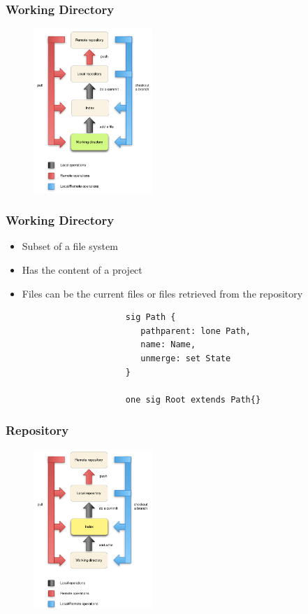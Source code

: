 \documentclass{beamer}
\begin{document}
\begin{frame}
   \frametitle{Working Directory}
   \begin{figure}
      \centering
      \includegraphics[width=0.4\textwidth]{images/workflow3.png}
   \end{figure}
\end{frame}

\begin{frame}[fragile]
   \frametitle{Working Directory}
   \begin{itemize}
      \item Subset of a file system
      \item Has the content of a project
      \item Files can be the current files or files retrieved
      from the repository
   \end{itemize}
   \tiny
   \color{blue}
   \begin{lstlisting}
                        sig Path {
                           pathparent: lone Path,
                           name: Name,
                           unmerge: set State
                        }

                        one sig Root extends Path{}
   \end{lstlisting}
\end{frame}

\begin{frame}
   \frametitle{Repository}
   \begin{figure}
      \centering
      \includegraphics[width=0.4\textwidth]{images/workflow1.png}
   \end{figure}
\end{frame}
\end{document}
